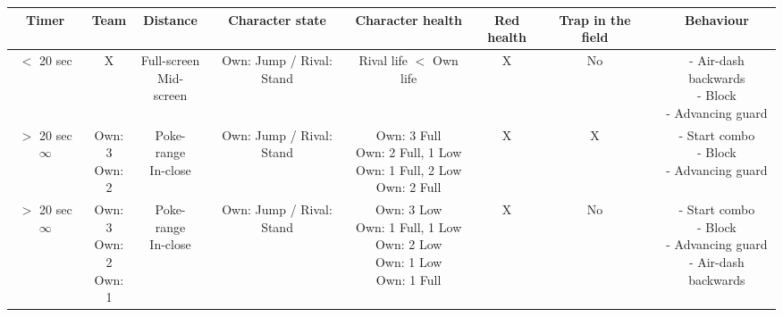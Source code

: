 \documentclass{article}
\begin{document}
\begin{landscape}
\begin{table}[h!]
\begin{center}
\begin{tabular*}{24cm}{c|c|c|c|c|c|c|c|c}
     \end{tabular*}
  \end{center}
\end{table}

\end{landscape}

\newpage


\begin{landscape}

\begin{table}[h!]
  \begin{center}
    \begin{tabular*}{24cm}{c|c|c|c|c|c|c|c|c}
    \textbf{Timer} & \textbf{Team} & \textbf{Distance} & \textbf{Character state} & \textbf{Character health} & \textbf{Red health} & \textbf{Trap in the field} & \textbf{} & \textbf{Behaviour}\\
    \hline
$<$ 20 sec & X & \makecell{Full-screen \\ Mid-screen} & Own: Jump / Rival: Stand & Rival life $<$ Own life & X & No & & \makecell{- Air-dash backwards \\ - Block \\ - Advancing guard}\\
     \hline
     \makecell{$>$ 20 sec \\ $\infty$} & \makecell{Own: 3 \\ Own: 2} & \makecell{Poke-range \\ In-close} & Own: Jump / Rival: Stand & \makecell{Own: 3 Full \\ Own: 2 Full, 1 Low \\ Own: 1 Full, 2 Low \\ Own: 2 Full} & X & X & & \makecell{- Start combo \\ - Block \\ - Advancing guard}\\
     \hline
     \makecell{$>$ 20 sec \\ $\infty$} & \makecell{Own: 3 \\ Own: 2 \\ Own: 1} & \makecell{Poke-range \\ In-close} & Own: Jump / Rival: Stand & \makecell {Own: 3 Low \\ Own: 1 Full, 1 Low \\ Own: 2 Low \\ Own: 1 Low \\ Own: 1 Full} & X & No & & \makecell{- Start combo \\ - Block \\ - Advancing guard \\ - Air-dash backwards}\\

\end{tabular*}
\end{center}
\end{table}
\end{landscape}
\end{document}
